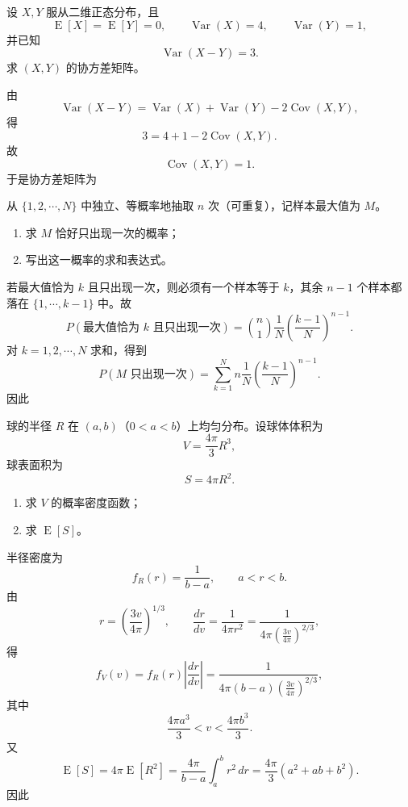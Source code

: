 ﻿

\begin{question}
设 $X,Y$ 服从二维正态分布，且
\[
\operatorname{E}[X]=\operatorname{E}[Y]=0,
\qquad \operatorname{Var}(X)=4,
\qquad \operatorname{Var}(Y)=1,
\]
并已知
\[
\operatorname{Var}(X-Y)=3.
\]
求 $(X,Y)$ 的协方差矩阵。
\begin{solution}
由
\[
\operatorname{Var}(X-Y)=\operatorname{Var}(X)+\operatorname{Var}(Y)-2\operatorname{Cov}(X,Y),
\]
得
\[
3=4+1-2\operatorname{Cov}(X,Y).
\]
故
\[
\operatorname{Cov}(X,Y)=1.
\]
于是协方差矩阵为
\end{solution}
\end{question}

\begin{question}
从 $\{1,2,\cdots,N\}$ 中独立、等概率地抽取 $n$ 次（可重复），记样本最大值为 $M$。
\begin{enumerate}[label=(\alph*),leftmargin=2.8em,itemsep=0.2em]
\item 求 $M$ 恰好只出现一次的概率；
\item 写出这一概率的求和表达式。
\end{enumerate}
\begin{solution}
若最大值恰为 $k$ 且只出现一次，则必须有一个样本等于 $k$，其余 $n-1$ 个样本都落在 $\{1,\cdots,k-1\}$ 中。故
\[
P(\text{最大值恰为 }k\text{ 且只出现一次})
=\binom{n}{1}\frac1N\left(\frac{k-1}{N}\right)^{n-1}.
\]
对 $k=1,2,\cdots,N$ 求和，得到
\[
P(M\text{ 只出现一次})
=\sum_{k=1}^{N}n\frac1N\left(\frac{k-1}{N}\right)^{n-1}.
\]
因此
\end{solution}
\end{question}

\begin{question}
球的半径 $R$ 在 $(a,b)$（$0<a<b$）上均匀分布。设球体体积为
\[
V=\frac{4\pi}{3}R^3,
\]
球表面积为
\[
S=4\pi R^2.
\]
\begin{enumerate}[label=(\alph*),leftmargin=2.8em,itemsep=0.2em]
\item 求 $V$ 的概率密度函数；
\item 求 $\operatorname{E}[S]$。
\end{enumerate}
\begin{solution}
半径密度为
\[
f_R(r)=\frac1{b-a},\qquad a<r<b.
\]
由
\[
r=\left(\frac{3v}{4\pi}\right)^{1/3},
\qquad
\frac{dr}{dv}=\frac{1}{4\pi r^2}
=\frac{1}{4\pi\left(\frac{3v}{4\pi}\right)^{2/3}},
\]
得
\[
f_V(v)=f_R(r)\left|\frac{dr}{dv}\right|
=\frac{1}{4\pi(b-a)\left(\frac{3v}{4\pi}\right)^{2/3}},
\]
其中
\[
\frac{4\pi a^3}{3}<v<\frac{4\pi b^3}{3}.
\]
又
\[
\operatorname{E}[S]=4\pi \operatorname{E}[R^2]
=\frac{4\pi}{b-a}\int_a^b r^2\,dr
=\frac{4\pi}{3}(a^2+ab+b^2).
\]
因此
\end{solution}
\end{question}


